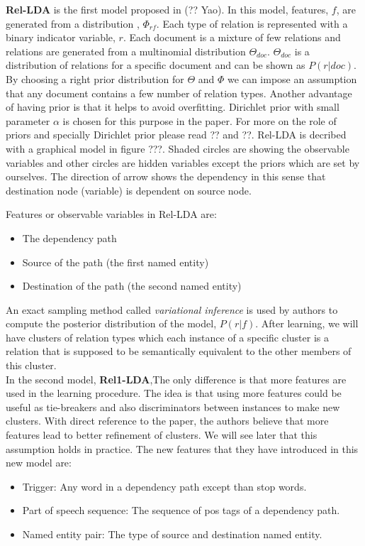 \documentclass[12pt]{report}
\begin{document}
\textbf{Rel-LDA} is the first model proposed in (?? Yao). 
In this model, features, $f$, are generated from a distribution , $\Phi_{rf}$. Each type
 of relation is represented with a binary indicator variable, $r$. Each document is a mixture of few relations
  and relations are generated from a multinomial distribution $\Theta_{doc}$. $\Theta_{doc}$ is a distribution
  of relations for a specific document and can be shown as $P(r|doc)$. By choosing a right prior distribution for $\Theta$
   and $\Phi$ we can impose an assumption that any document contains a few number of relation types. 
   Another advantage of having prior is that it helps to avoid overfitting. Dirichlet prior with small parameter $\alpha$ is 
   chosen for this purpose in the paper. For more on the role of priors and specially Dirichlet prior
    please read ?? and ??.
    Rel-LDA is decribed with a graphical model in figure ???.
    Shaded circles are showing the observable variables and other circles are hidden variables except 
    the priors which are set by ourselves. The direction of arrow shows the dependency in this sense 
    that destination node (variable) is dependent on source node.
      
    Features or observable variables in Rel-LDA are:
    \begin{itemize}
      \item The dependency path
      \item Source of the path (the first named entity)
      \item Destination of the path (the second named entity)
    \end{itemize}
   	
   	An exact sampling method called \emph{variational inference} is used by authors to compute 
   	the posterior distribution of the model, $P(r|f)$.
   	After learning, we will have clusters of relation types which each instance of a specific cluster 
   	is a relation that is supposed to be semantically equivalent to the other members of this cluster.
   	\\
   	
   	In the second model, \textbf{Rel1-LDA},The only difference is that  more features are used in the learning procedure.
   	 The idea is that using more features could be useful as tie-breakers and also discriminators between instances
   	  to make new clusters. With direct reference to the paper, the authors believe that more features 
   	  lead to better refinement of clusters. We will see later that this assumption holds in practice.
   	   The new features that they have introduced in this new model are:
   	   \begin{itemize}
   	     \item Trigger: Any word in a dependency path except than stop words. 
   	     \item Part of speech sequence: The sequence of pos tags of a dependency path. 
   	     \item Named entity pair: The type of source and destination named entity. 
   	   \end{itemize}   
   
\end{document}
